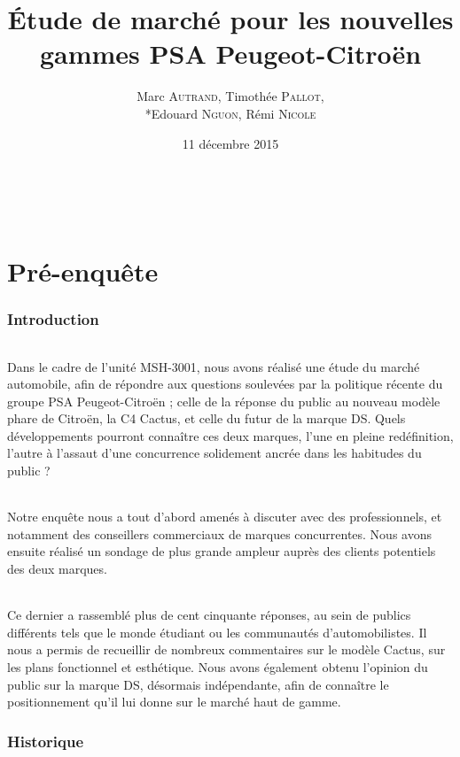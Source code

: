 \documentclass[12pt]{article}\usepackage[]{graphicx}\usepackage[]{color}
\title{\textbf{Étude de marché pour les nouvelles gammes PSA Peugeot-Citroën}}
\author{Marc \textsc{Autrand}, Timothée \textsc{Pallot},\\*Edouard
	\textsc{Nguon}, Rémi \textsc{Nicole}}
\date{11 décembre 2015}
\begin{document}
\maketitle

\break
~
\newpage
\break
\tableofcontents

\part{Pré-enquête}

\section{Introduction}

\paragraph{} Dans le cadre de l'unité MSH-3001, nous avons réalisé une étude du
marché automobile, afin de répondre aux questions soulevées par la politique récente
du groupe PSA Peugeot-Citroën ; celle de la réponse du public au nouveau modèle
phare de Citroën, la C4 Cactus, et celle du futur de la marque DS. Quels développements
pourront connaître ces deux marques, l'une en pleine redéfinition, l'autre à l'assaut
d'une concurrence solidement ancrée dans les habitudes du public ?

\paragraph{} Notre enquête nous a tout d'abord amenés à discuter avec des professionnels,
et notamment des conseillers commerciaux de marques concurrentes. Nous avons ensuite
réalisé un sondage de plus grande ampleur auprès des clients potentiels des deux marques.

\paragraph{} Ce dernier a rassemblé plus de cent cinquante réponses, au sein de publics
différents tels que le monde étudiant ou les communautés d'automobilistes. Il nous a
permis de recueillir de nombreux commentaires sur le modèle Cactus, sur les plans fonctionnel
et esthétique. Nous avons également obtenu l'opinion du public sur la marque DS, désormais
indépendante, afin de connaître le positionnement qu'il lui donne sur le
marché haut de gamme.

\break
\section{Historique}
\end{document}
